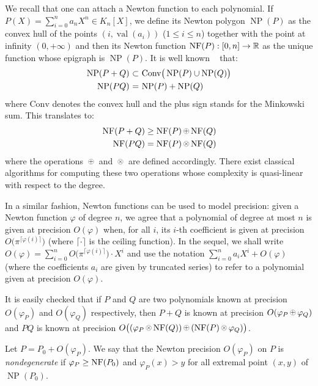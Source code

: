 \documentclass{sig-alternate-2013}
\DeclareMathOperator{\NP}{NP}
\DeclareMathOperator{\val}{val}
\newcommand{\R}{\mathbb R}
\newcommand{\NF}{\text{\rm NF}}
\newcommand{\nfop}[1]{%
\raisebox{-0.1mm}{\begin{tikzpicture}
\draw[transparent] (-0.18,0)--(0.18,0);
\draw[very thin] (0,0) circle (0.11cm);
\begin{scope}
\clip (0,0) circle (0.11cm);
\node[scale=0.75] at (0,0) { $#1$ };
\end{scope}
\end{tikzpicture}}}
\newcommand{\nfplus}{\nfop+}
\newcommand{\nftimes}{\nfop\times}
\def\todo#1{\ \!\!{\color{red} #1}}
\begin{document}
We recall that one can attach a Newton function to each polynomial.
If $P(X) = \sum_{i=0}^n a_n X^n \in K_n[X]$, we define its Newton
polygon $\NP(P)$ as the convex hull of the points $(i,\val(a_i))$ 
($1 \leq i \leq n$) together with the point at infinity $(0,+\infty)$
and then its Newton function $\NF(P) : [0,n] \to \R$ as the unique
function whose epigraph is $\NP(P)$. It is well known \todo{(Give a
reference?)} that:
$$\begin{array}{r@{\,\,}c@{\,\,}l}
\NP(P+Q) & \subset & \text{Conv}\big(\NP(P) \cup \NP(Q)\big) \smallskip \\
\NP(PQ) & = & \NP(P) + \NP(Q)
\end{array}$$
where $\text{Conv}$ denotes the convex hull and the plus sign stands 
for the Minkowski sum. This translates to:
$$\begin{array}{r@{\,\,}c@{\,\,}l}
\NF(P+Q) \geq \NF(P) \nfplus \NF(Q) \smallskip \\
\NF(PQ) = \NF(P) \nftimes \NF(Q)
\end{array}$$
where the operations $\nfplus$ and $\nftimes$ are defined accordingly.
There exist classical algorithms for computing these two operations
whose complexity is quasi-linear with respect to the degree.

In a similar fashion, Newton functions can be used to model precision: 
given a Newton function $\varphi$ of degree $n$, we agree that a polynomial 
of degree at most $n$ is given at precision $O(\varphi)$ when, for all $i$,
its $i$-th coefficient is given at precision $O\big(\pi^{\lceil \varphi(i)
\rceil}\big)$ (where $\lceil \cdot \rceil$ is the ceiling function).
In the sequel, we shall write
$O(\varphi) = \sum_{i=0}^n O\big(\pi^{\lceil \varphi(i) \rceil}\big) \cdot X^i$
and use the notation $\sum_{i=0}^n a_i X^i + O(\varphi)$ (where the
coefficients $a_i$ are given by truncated series) to refer to a 
polynomial given at precision $O(\varphi)$.

It is easily checked that if $P$ and $Q$ are two polynomials known at 
precision $O(\varphi_P)$ and $O(\varphi_Q)$ respectively, then $P+Q$ is 
known at precision $O(\varphi_P \nfplus \varphi_Q)$ and $PQ$ is known at 
precision $O\big((\varphi_P \nftimes \NF(Q)) \nfplus (\NF(P) \nftimes 
\varphi_Q)\big)$.

\begin{deftn}
\label{def:nondeg}
Let $P = P_0 + O(\varphi_P)$. We say that the Newton precision 
$O(\varphi_P)$ on $P$ is \emph{nondegenerate} if $\varphi_P \geq 
\NF(P_0)$ and $\varphi_P(x) > y$ for all extremal point $(x,y)$ of 
$\NP(P_0)$.
\end{deftn}
\end{document}
